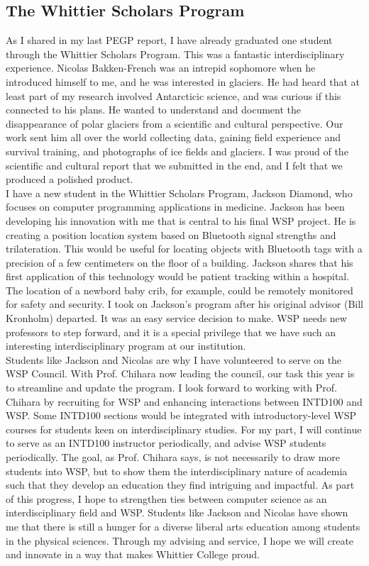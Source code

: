 \documentclass[../../../main.tex]{subfiles}
\begin{document}
\subsection{The Whittier Scholars Program}

As I shared in my last PEGP report, I have already graduated one student through the Whittier Scholars Program.  This was a fantastic interdisciplinary experience.  Nicolas Bakken-French was an intrepid sophomore when he introduced himself to me, and he was interested in glaciers.  He had heard that at least part of my research involved Antarcticic science, and was curious if this connected to his plans.  He wanted to understand and document the disappearance of polar glaciers from a scientific and cultural perspective.  Our work sent him all over the world collecting data, gaining field experience and survival training, and photographs of ice fields and glaciers.  I was proud of the scientific and cultural report that we submitted in the end, and I felt that we produced a polished product.
\\
\vspace{0.25cm}
I have a new student in the Whittier Scholars Program, Jackson Diamond, who focuses on computer programming applications in medicine.  Jackson has been developing his innovation with me that is central to his final WSP project.  He is creating a position location system based on Bluetooth signal strengths and trilateration.  This would be useful for locating objects with Bluetooth tags with a precision of a few centimeters on the floor of a building.  Jackson shares that his first application of this technology would be patient tracking within a hospital.  The location of a newbord baby crib, for example, could be remotely monitored for safety and security.  I took on Jackson's program after his original advisor (Bill Kronholm) departed.  It was an easy service decision to make.  WSP needs new professors to step forward, and it is a special privilege that we have such an interesting interdisciplinary program at our institution.
\\
\vspace{0.25cm}
Students like Jackson and Nicolas are why I have volunteered to serve on the WSP Council.  With Prof. Chihara now leading the council, our task this year is to streamline and update the program.  I look forward to working with Prof. Chihara by recruiting for WSP and enhancing interactions between INTD100 and WSP.  Some INTD100 sections would be integrated with introductory-level WSP courses for students keen on interdisciplinary studies.  For my part, I will continue to serve as an INTD100 instructor periodically, and advise WSP students periodically.  The goal, as Prof. Chihara says, is not necessarily to draw more students into WSP, but to show them the interdisciplinary nature of academia such that they develop an education they find intriguing and impactful.  As part of this progress, I hope to strengthen ties between computer science as an interdisciplinary field and WSP.  Students like Jackson and Nicolas have shown me that there is still a hunger for a diverse liberal arts education among students in the physical sciences.  Through my advising and service, I hope we will create and innovate in a way that makes Whittier College proud.
\end{document}
